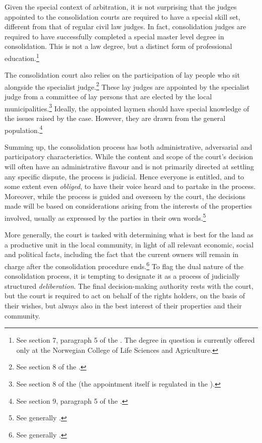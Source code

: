 Given the special context of arbitration, it is not surprising that the judges appointed to the consolidation courts are required to have a special skill set, different from that of regular civil law judges. In fact, consolidation judges are required to have successfully completed a special master level degree in consolidation. This is not a law degree, but a distinct form of professional education.\footnote{See section 7, paragraph 5 of the \cite{lca79}. The degree in question is currently offered only at the Norwegian College of Life Sciences and Agriculture.}

The consolidation court also relies on the participation of lay people who sit alongside the specialist judge.\footnote{See section 8 of the \cite{lca79}.} These lay judges are appointed by the specialist judge from a committee of lay persons that are elected by the local municipalities.\footnote{See section 8 of the \cite{lca79} (the appointment itself is regulated in the \dni\cite[64]{ca15}).} Ideally, the appointed laymen should have special knowledge of the issues raised by the case. However, they are drawn from the general population.\footnote{See section 9, paragraph 5 of the \cite{lca79}.}

Summing up, the consolidation process has both administrative, adversarial and participatory characteristics. While the content and scope of the court's decision will often have an administrative flavour and is not primarily directed at settling any specific dispute, the process is judicial. Hence everyone is entitled, and to some extent even \emph{obliged}, to have their voice heard and to partake in the process. Moreover, while the process is guided and overseen by the court, the decisions made will be based on considerations arising from the interests of the properties involved, usually as expressed by the parties in their own words.\footnote{See generally \cite{rognes07}.}

More generally, the court is tasked with determining what is best for the land as a productive unit in the local community, in light of all relevant economic, social and political facts, including the fact that the current owners will remain in charge after the consolidation procedure ends.\footnote{See generally \cite{reiten09,sky09}.} To flag the dual nature of the consolidation process, it is tempting to designate it as a process of judicially structured \emph{deliberation}. The final decision-making authority rests with the court, but the court is required to act on behalf of the rights holders, on the basis of their wishes, but always also in the best interest of their properties and their community.

